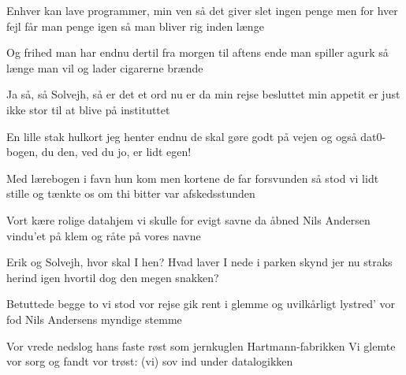 \documentclass[a4paper,11pt]{article}
\begin{document}
\begin{song}
Enhver kan lave programmer, min ven
så det giver slet ingen penge
men for hver fejl får man penge igen
så man bliver rig inden længe

Og frihed man har endnu dertil
fra morgen til aftens ende
man spiller agurk så længe man vil
og lader cigarerne brænde

Ja så, så Solvejh, så er det et ord
nu er da min rejse besluttet
min appetit er just ikke stor
til at blive på instituttet

En lille stak hulkort jeg henter endnu
de skal gøre godt på vejen
og også dat0-bogen, du
den, ved du jo, er lidt egen!

Med lærebogen i favn hun kom
men kortene de far forsvunden
så stod vi lidt stille og tænkte os om
thi bitter var afskedsstunden

Vort kære rolige datahjem
vi skulle for evigt savne
da åbned Nils Andersen vindu'et på klem
og råte på vores navne

Erik og Solvejh, hvor skal I hen?
Hvad laver I nede i parken
skynd jer nu straks herind igen
hvortil dog den megen snakken?

Betuttede begge to vi stod
vor rejse gik rent i glemme
og uvilkårligt lystred' vor fod
Nils Andersens myndige stemme

Vor vrede nedslog hans faste røst
som jernkuglen Hartmann-fabrikken
Vi glemte vor sorg og fandt vor trøst:
(vi) sov ind under datalogikken
\end{song}
\end{document}
